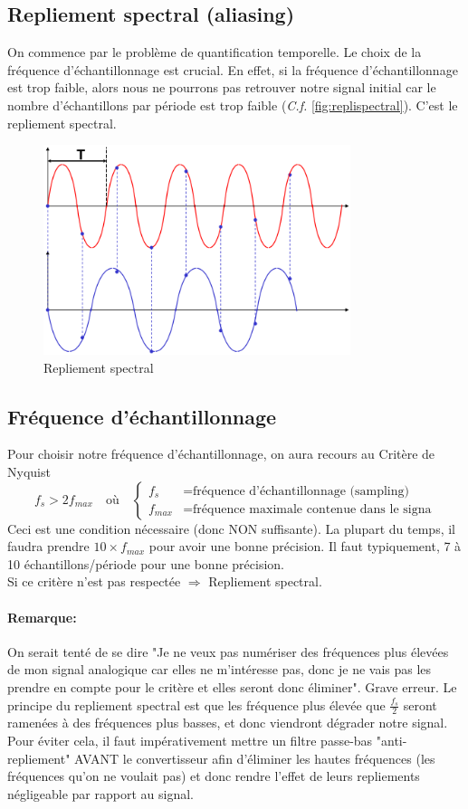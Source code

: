 \subsection{Repliement spectral (aliasing)}
On commence par le problème de quantification temporelle. Le choix de la fréquence d'échantillonnage est crucial. En effet, si la fréquence d'échantillonnage est trop faible, alors nous ne pourrons pas retrouver notre signal initial  car le nombre d'échantillons par période est trop faible (\textit{C.f.} \autoref{fig:replispectral}). C'est le repliement spectral.
\begin{figure}[H] 
	\centering 
	\includegraphics[width=0.8\textwidth,height=10\baselineskip,keepaspectratio]{ch5/image2} 
	\caption{Repliement spectral} 
	\label{fig:replispectral}
\end{figure}
\subsection{Fréquence d'échantillonnage}
Pour choisir notre fréquence d'échantillonnage, on aura recours au Critère de Nyquist
\[f_s>2f_{max}\quad\text{où}\quad \left\{\begin{array}{ll}
f_s &= \text{fréquence d'échantillonnage (sampling)}\\
f_{max} &= \text{fréquence maximale contenue dans le signa}
\end{array}\right.\]
Ceci est une condition nécessaire (donc NON suffisante). La plupart du temps, il faudra prendre \(10\times f_{max}\) pour avoir une bonne précision. Il faut typiquement, 7 à 10 échantillons/période pour une bonne précision.\\
Si ce critère n'est pas respectée \(\Rightarrow\) Repliement spectral.
\paragraph{Remarque:} On serait tenté de se dire "Je ne veux pas numériser des fréquences plus élevées de mon signal analogique car elles ne m'intéresse pas, donc je ne vais pas les prendre en compte pour le critère et elles seront donc éliminer". Grave erreur. Le principe du repliement spectral est que les fréquence plus élevée que \(\frac{f_s}{2}\) seront ramenées à des fréquences plus basses, et donc viendront dégrader notre signal. Pour éviter cela, il faut impérativement mettre un filtre passe-bas "anti-repliement" AVANT le convertisseur afin d'éliminer les hautes fréquences (les fréquences qu'on ne voulait pas) et donc rendre l'effet de leurs repliements négligeable par rapport au signal.
